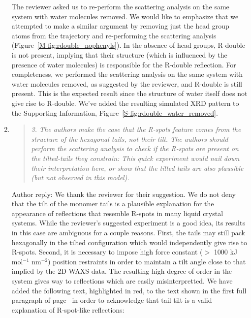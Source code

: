 \documentclass{article}
\begin{document}
\begin{enumerate}
    The reviewer asked us to re-perform the scattering analysis on the same
    system with water molecules removed. We would like to emphasize that we
    attempted to make a similar argument by removing just the head group atoms from
    the trajectory and re-performing the scattering analysis
    (Figure~\ref{M-fig:rdouble_nophenyls}). In the absence of head groups, R-double
    is not present, implying that their structure (which is influenced by the
    presence of water molecules) is responsible for the R-double reflection. For
    completeness, we performed the scattering analysis on the same system with
    water molecules removed, as suggested by the reviewer, and R-double is still
    present. This is the expected result since the structure of water itself does
    not give rise to R-double. We've added the resulting simulated XRD pattern to
    the Supporting Information, Figure~\ref{S-fig:rdouble_water_removed}. 
   
    \item \begin{quote}
    \textit{3. The authors make the case that the R-spots feature comes from the 
    structure of the hexagonal tails, not their tilt. The authors should perform the
    scattering analysis to check if the R-spots are present on the tilted-tails they
    constrain: This quick experiment would nail down their interpretation here, or 
    show that the tilted tails are also plausible (but not observed in this model).}
    \end{quote}

    Author reply: We thank the reviewer for their suggestion. We do not deny
    that the tilt of the monomer tails is a plausible explanation for the
    appearance of reflections that resemble R-spots in many liquid crystal systems.
    While the reviewer's suggested experiment is a good idea, its results in this
    case are ambiguous for a couple reasons. First, the tails may still pack
    hexagonally in the tilted configuration which would independently give rise to
    R-spots. Second, it is necessary to impose high force constant ($>$ 1000 kJ mol$^{-1}$
    nm$^{-2}$) position restraints in order to maintain a tilt angle close to that
    implied by the 2D WAXS data. The resulting high degree of order in the system 
    gives way to reflections which are easily misinterpretted. We have added the
    following text, highlighted in red, to the text shown in the first full paragraph of
    page~\pageref{M-addition:rspots} in order to acknowledge that tail tilt is a 
    valid explanation of R-spot-like reflections: 
 

\end{enumerate}
\end{document}
